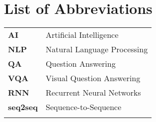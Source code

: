 \chapter{List of Abbreviations}
\begin{tabular}{ll}
\vspace{3mm}
\textbf{AI} 		 & Artificial Intelligence\\ \vspace{3mm}
\textbf{NLP}         & Natural Language Processing\\ \vspace{3mm}
\textbf{QA}          & Question Answering\\ \vspace{3mm}
\textbf{VQA} 	     & Visual Question Answering\\ \vspace{3mm}
\textbf{RNN} 		 & Recurrent Neural Networks\\ \vspace{3mm}
\textbf{seq2seq} 	 & Sequence-to-Sequence\\ \vspace{3mm}

\end{tabular}
